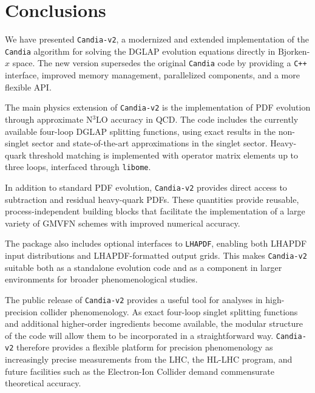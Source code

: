\documentclass[preprint,12pt]{elsarticle}
\begin{document}
\section{Conclusions}
\label{sec:conclusions}

We have presented \texttt{Candia-v2}, a modernized and extended implementation
of the \texttt{Candia} algorithm for solving the DGLAP evolution equations
directly in Bjorken-$x$ space. The new version supersedes the original
\texttt{Candia} code by providing a \texttt{C++} interface, improved memory management,
parallelized components, and a more flexible API.

The main physics extension of \texttt{Candia-v2} is the implementation of PDF
evolution through approximate N$^3$LO accuracy in QCD. The code includes the currently
available four-loop DGLAP splitting functions, using exact results in the
non-singlet sector and state-of-the-art approximations in the singlet sector.
Heavy-quark threshold matching is implemented with operator matrix elements up
to three loops, interfaced through \texttt{libome}. 

In addition to standard PDF evolution, \texttt{Candia-v2} provides direct access
to subtraction and residual heavy-quark PDFs. These quantities provide reusable, process-independent building blocks that facilitate the implementation of a large variety of GMVFN schemes with improved numerical accuracy.

The package also includes optional interfaces to \texttt{LHAPDF}, enabling both LHAPDF input distributions and LHAPDF-formatted output grids. This makes
\texttt{Candia-v2} suitable both as a standalone evolution code and as a
component in larger environments for broader phenomenological studies. 

The public release of \texttt{Candia-v2} provides a useful tool for analyses in high-precision collider phenomenology. As exact
four-loop singlet splitting functions and additional higher-order ingredients
become available, the modular structure of the code will allow them to be
incorporated in a straightforward way. \texttt{Candia-v2} therefore provides a
flexible platform for precision phenomenology as increasingly precise measurements from the LHC, the HL-LHC program, and future facilities such as the Electron-Ion Collider demand commensurate theoretical accuracy.



\end{document}
